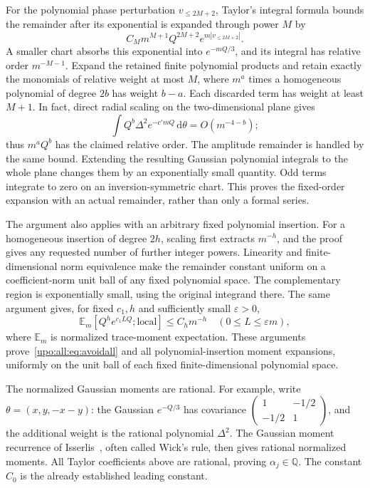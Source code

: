 \documentclass[11pt,letterpaper]{article}
\theoremstyle{remark}\newtheorem{remark}[theorem]{Remark}
\numberwithin{equation}{section}
\newcommand{\E}{\mathbb E}
\newcommand{\dd}{\,\mathrm d}
\begin{document}
For the polynomial phase perturbation $v_{\le2M+2}$, Taylor's integral
formula bounds the remainder after its exponential is expanded through
power $M$ by
\[
C_M m^{M+1}Q^{2M+2}e^{m|v_{\le2M+2}|}.
\]
A smaller chart absorbs this exponential into $e^{-mQ/3}$, and its
integral has relative order $m^{-M-1}$. Expand the retained finite
polynomial products and retain exactly the monomials of relative
weight at most $M$, where $m^a$ times a homogeneous polynomial of
degree $2b$ has weight $b-a$. Each discarded term has weight at least
$M+1$. In fact, direct radial scaling on the two-dimensional plane gives
\[
\int Q^b\Delta^2 e^{-c'mQ}\dd\theta=O(m^{-4-b});
\]
thus $m^aQ^b$ has the claimed relative order. The amplitude remainder is
handled by the same bound. Extending the resulting Gaussian polynomial
integrals to the whole plane changes them by an exponentially small
quantity. Odd terms integrate to zero on an inversion-symmetric chart.
This proves the fixed-order expansion with an actual remainder, rather
than only a formal series.

The argument also applies with an arbitrary fixed polynomial insertion.
For a homogeneous insertion of degree $2h$, scaling first extracts
$m^{-h}$, and the proof gives any requested number of further integer
powers. Linearity and finite-dimensional norm equivalence make the
remainder constant uniform on a coefficient-norm unit ball of any
fixed polynomial space. The complementary region is exponentially
small, using the original integrand there.
The same argument gives, for fixed $c_1,h$ and sufficiently small
$\varepsilon>0$,
\begin{equation}\label{upo:all:eq:moment}
\E_m[Q^h e^{c_1LQ};\mathrm{local}]\le C_hm^{-h}
\quad(0\le L\le\varepsilon m),
\end{equation}
where $\E_m$ is normalized trace-moment expectation.
These arguments prove~\eqref{upo:all:eq:avoidall} and all polynomial-insertion
moment expansions, uniformly on the unit ball of each fixed
finite-dimensional polynomial space.

The normalized Gaussian moments are rational. For example, write
$\theta=(x,y,-x-y)$: the Gaussian $e^{-Q/3}$ has covariance
$\left(\begin{smallmatrix}1&-1/2\\-1/2&1\end{smallmatrix}\right)$,
and the additional weight is the rational polynomial $\Delta^2$.
The Gaussian moment recurrence of Isserlis~\cite{Isserlis}, often
called Wick's rule, then gives rational normalized moments. All Taylor
coefficients above are rational, proving $\alpha_j\in\mathbb Q$.
The constant $C_0$ is the already established leading constant.
\end{document}
